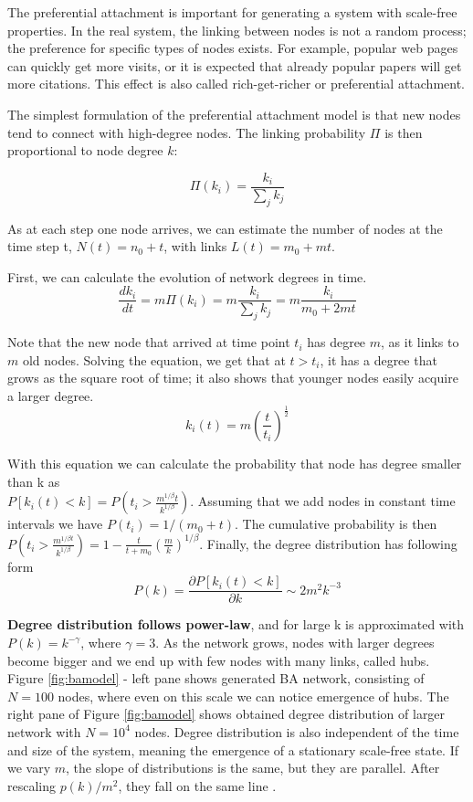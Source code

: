 The preferential attachment is important for generating a system with scale-free properties. In the real system, the linking between nodes is not a random process; the preference for specific types of nodes exists. For example, popular web pages can quickly get more visits, or it is expected that already popular papers will get more citations. This effect is also called rich-get-richer or preferential attachment.

The simplest formulation of the preferential attachment model is that new nodes tend to connect with high-degree nodes. The linking probability $\Pi$ is then proportional to node degree $k$:  

\begin{equation}
\Pi(k_i) = \frac{k_i}{\sum_jk_j} 
\end{equation} 

As at each step one node arrives, we can estimate the number of nodes at the time step t, $N(t) = n_0+t$, with links $L(t) =m_0+ mt$. 

First, we can calculate the evolution of network degrees in time.
\begin{equation}
\frac{dk_i}{dt} = m\Pi(k_i) = m\frac{k_i}{\sum_jk_j} = m\frac{k_i}{m_0 + 2mt}
\end{equation}

Note that the new node that arrived at time point $t_i$ has degree $m$, as it links to $m$ old nodes. Solving the equation, we get that at $t>t_i$, it has a degree that grows as the square root of time; it also shows that younger nodes easily acquire a larger degree. 
\begin{equation}
k_i(t) = m \left(\frac{t}{t_i}\right)^{\frac{1}{2}}
\end{equation}

With this equation we can calculate the probability that node has degree smaller than k  as \\ $P[k_i(t)<k] = P(t_i > \frac{m^{1/\beta}t}{k^{1/\beta}})$. Assuming that we add nodes in constant time intervals we have $P(t_i) = 1/(m_0+t)$. The cumulative probability is then  $P(t_i>\frac{m^{1/\beta t}}{k^{1/\beta}}) = 1 - \frac{t}{t+m_0}\left(\frac{m}{k}\right)^{1/\beta} $.
Finally, the degree distribution has following form
\begin{equation}
P(k) = \frac{\partial P[k_i(t)<k]}{ \partial k} \sim 2m^2 k^{-3} 
\end{equation}

\textbf{Degree distribution follows power-law}, and for large k is approximated with $P(k) = k^{-\gamma}$, where $\gamma=3$. As the network grows, nodes with larger degrees become bigger and we end up with few nodes with many links, called hubs. Figure \ref{fig:bamodel} - left pane shows generated BA network, consisting of $N=100$ nodes, where even on this scale we can notice emergence of hubs. The right pane of Figure \ref{fig:bamodel} shows obtained degree distribution of larger network with $N=10^4$ nodes. Degree distribution is also independent of the time and size of the system, meaning the emergence of a stationary scale-free state.  If we vary $m$, the slope of distributions is the same, but they are parallel. After rescaling $p(k)/m^2$, they fall on the same line \cite{barabasi2016network}.  

